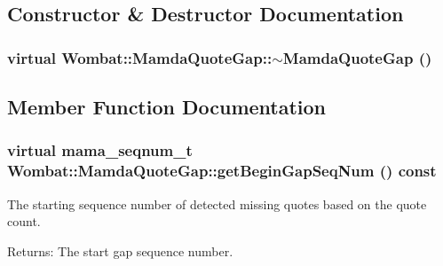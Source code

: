 \subsection{Constructor \& Destructor Documentation}
\hypertarget{classWombat_1_1MamdaQuoteGap_08782dae0fa806679f0d2789e0bd27ff}{
\subsubsection[$\sim$MamdaQuoteGap]{\setlength{\rightskip}{0pt plus 5cm}virtual Wombat::Mamda\-Quote\-Gap::$\sim$Mamda\-Quote\-Gap ()}}
\label{classWombat_1_1MamdaQuoteGap_08782dae0fa806679f0d2789e0bd27ff}




\subsection{Member Function Documentation}
\hypertarget{classWombat_1_1MamdaQuoteGap_f87125caab3a18c6dde0b5dc5e13f35a}{
\subsubsection[getBeginGapSeqNum]{\setlength{\rightskip}{0pt plus 5cm}virtual mama\_\-seqnum\_\-t Wombat::Mamda\-Quote\-Gap::get\-Begin\-Gap\-Seq\-Num () const}}
\label{classWombat_1_1MamdaQuoteGap_f87125caab3a18c6dde0b5dc5e13f35a}


The starting sequence number of detected missing quotes based on the quote count. 

\begin{Desc}
\item[Returns:]The start gap sequence number. \end{Desc}


